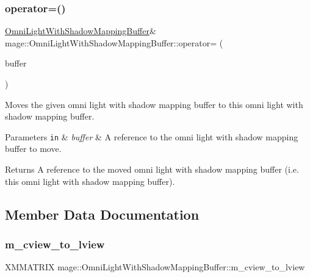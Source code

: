 \subsubsection{\texorpdfstring{operator=()}{operator=()}\hspace{0.1cm}{\footnotesize\ttfamily [2/2]}}
{\footnotesize\ttfamily \hyperlink{structmage_1_1_omni_light_with_shadow_mapping_buffer}{Omni\+Light\+With\+Shadow\+Mapping\+Buffer}\& mage\+::\+Omni\+Light\+With\+Shadow\+Mapping\+Buffer\+::operator= (\begin{DoxyParamCaption}\item[{\hyperlink{structmage_1_1_omni_light_with_shadow_mapping_buffer}{Omni\+Light\+With\+Shadow\+Mapping\+Buffer} \&\&}]{buffer }\end{DoxyParamCaption})\hspace{0.3cm}{\ttfamily [default]}}

Moves the given omni light with shadow mapping buffer to this omni light with shadow mapping buffer.


\begin{DoxyParams}[1]{Parameters}
\mbox{\tt in}  & {\em buffer} & A reference to the omni light with shadow mapping buffer to move. \\
\hline
\end{DoxyParams}
\begin{DoxyReturn}{Returns}
A reference to the moved omni light with shadow mapping buffer (i.\+e. this omni light with shadow mapping buffer). 
\end{DoxyReturn}


\subsection{Member Data Documentation}
\hypertarget{structmage_1_1_omni_light_with_shadow_mapping_buffer_ac8818649198198519826adf18fe0da7d}{}\label{structmage_1_1_omni_light_with_shadow_mapping_buffer_ac8818649198198519826adf18fe0da7d} 
\subsubsection{\texorpdfstring{m\+\_\+cview\+\_\+to\+\_\+lview}{m\_cview\_to\_lview}}
{\footnotesize\ttfamily X\+M\+M\+A\+T\+R\+IX mage\+::\+Omni\+Light\+With\+Shadow\+Mapping\+Buffer\+::m\+\_\+cview\+\_\+to\+\_\+lview}

